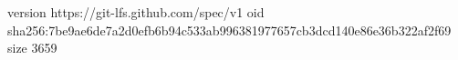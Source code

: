 version https://git-lfs.github.com/spec/v1
oid sha256:7be9ae6de7a2d0efb6b94c533ab996381977657cb3dcd140e86e36b322af2f69
size 3659
